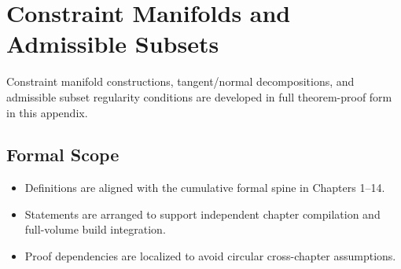 \documentclass[../../clio.tex]{subfiles}
\begin{document}
\chapter{Constraint Manifolds and Admissible Subsets}
\label{apx:a-constraint-manifolds}

Constraint manifold constructions, tangent/normal decompositions, and admissible subset regularity conditions are developed in full theorem-proof form in this appendix.

\section{Formal Scope}
\begin{itemize}
  \item Definitions are aligned with the cumulative formal spine in Chapters 1--14.
  \item Statements are arranged to support independent chapter compilation and full-volume build integration.
  \item Proof dependencies are localized to avoid circular cross-chapter assumptions.
\end{itemize}
\end{document}

